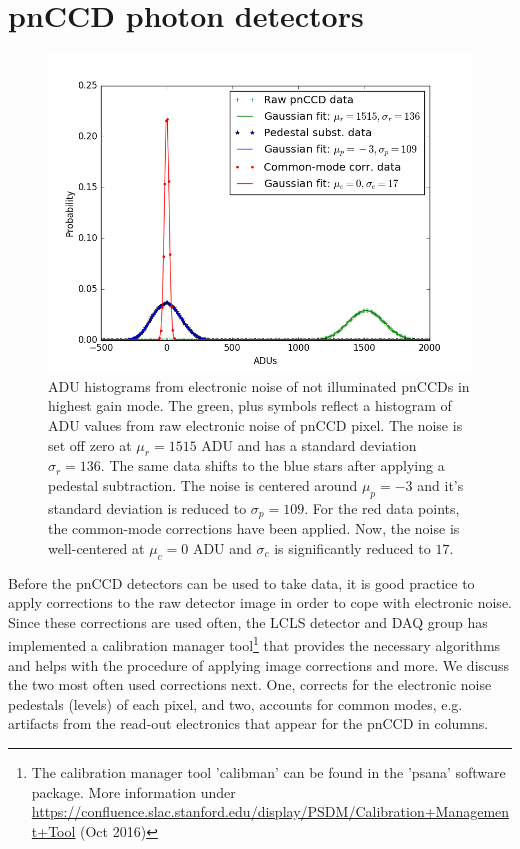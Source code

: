 \section{pnCCD photon detectors}\label{sec:pnccd-corr}
\begin{figure}
	\centering
		\includegraphics[height=0.50\textwidth]{images/pnCCD-electronic-noise.png}
	\caption[ADU histograms from electronic noise of unilluminated pnCCDs.]{ADU histograms from electronic noise of not illuminated pnCCDs in highest gain mode. The green, plus symbols reflect a histogram of ADU values from raw electronic noise of pnCCD pixel. The noise is set off zero at $\mu_{r}=1515$ ADU and has a standard deviation $\sigma_{r}=136$. The same data shifts to the blue stars after applying a pedestal subtraction. The noise is centered around $\mu_{p}=-3$ and it's standard deviation is reduced to $\sigma_{p}=109$. For the red data points, the common-mode corrections have been applied. Now, the noise is well-centered at $\mu_{c}=0$ ADU and $\sigma_{c}$ is significantly reduced to $17$.}
	\label{fig:pnCCD-electronic-noise}
\end{figure}
Before the pnCCD detectors can be used to take data, it is good practice to apply corrections to the raw detector image in order to cope with electronic noise. Since these corrections are used often, the LCLS detector and DAQ group has implemented a calibration manager tool\footnote{The calibration manager tool 'calibman' can be found in the 'psana' software package. More information under \url{https://confluence.slac.stanford.edu/display/PSDM/Calibration+Management+Tool} (Oct 2016)} that provides the necessary algorithms and helps with the procedure of applying image corrections and more. We discuss the two most often used corrections next. One, corrects for the electronic noise pedestals (levels) of each pixel, and two, accounts for common modes, e.g. artifacts from the read-out electronics that appear for the pnCCD in columns.\\
